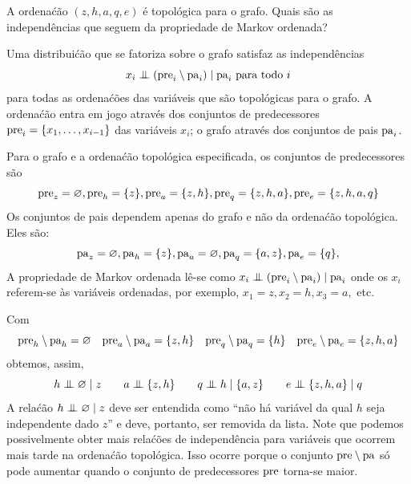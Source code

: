 \begin{center}
\end{center}

\begin{exenumerate}
    \item A ordena\'c\~ao $(z,h,a,q,e)$ \'e topol\'ogica para o grafo. Quais s\~ao as independ\^encias que seguem da propriedade de Markov ordenada?
    
    \begin{solution}
        Uma distribui\'c\~ao que se fatoriza sobre o grafo satisfaz as independ\^encias
        $$ x_i \mathrel{\perp\mspace{-10mu}\perp} \left(\mathrm{pre}_i \setminus \mathrm{pa}_i\right) \mid \mathrm{pa}_i \text{ para todo } i$$
        para todas as ordena\'c\~oes das vari\'aveis que s\~ao topol\'ogicas para o grafo. A ordena\'c\~ao entra em jogo atrav\'es dos conjuntos de predecessores $\mathrm{pre}_i = \{x_1, \ldots, x_{i-1}\}$ das vari\'aveis $x_i$; o grafo atrav\'es dos conjuntos de pais $\mathrm{pa}_i$.
        
        Para o grafo e a ordena\'c\~ao topol\'ogica especificada, os conjuntos de predecessores s\~ao
        $$\mathrm{pre}_z = \varnothing, \mathrm{pre}_h = \{z\}, \mathrm{pre}_a = \{z,h\}, \mathrm{pre}_q = \{z,h,a\}, \mathrm{pre}_e =\{z,h,a,q\}$$
        Os conjuntos de pais dependem apenas do grafo e n\~ao da ordena\'c\~ao topol\'ogica. Eles s\~ao:
        $$\mathrm{pa}_z = \varnothing, \mathrm{pa}_h = \{z\}, \mathrm{pa}_a = \varnothing, \mathrm{pa}_q =\{a,z\}, \mathrm{pa}_e = \{q\}, $$
        A propriedade de Markov ordenada l\^e-se como $x_i \mathrel{\perp\mspace{-10mu}\perp} \left(\mathrm{pre}_i \setminus \mathrm{pa}_i \right)\mid \mathrm{pa}_i$ onde os $x_i$ referem-se \`as vari\'aveis ordenadas, por exemplo, $x_1 = z, x_2 = h, x_3 = a,$ etc.
        
        Com
        $$ \mathrm{pre}_h \setminus \mathrm{pa}_h = \varnothing \quad \mathrm{pre}_a \setminus \mathrm{pa}_a = \{z,h\} \quad \mathrm{pre}_q \setminus \mathrm{pa}_q = \{h\} \quad \mathrm{pre}_e \setminus \mathrm{pa}_e = \{z,h,a\}$$
        obtemos, assim,
        $$ h \independent \varnothing \mid z \quad \quad
        a \independent \{z,h\} \quad \quad q \independent
        h \mid \{a,z\} \quad \quad e \independent \{z,h,a\} \mid q$$ A
        rela\'c\~ao $ h \mathrel{\perp\mspace{-10mu}\perp} \varnothing \mid z$ deve ser entendida como
        ``n\~ao h\'a vari\'avel da qual $h$ seja independente dado $z$'' e
        deve, portanto, ser removida da lista. Note que podemos possivelmente
        obter mais rela\'c\~oes de independ\^encia para vari\'aveis que ocorrem mais tarde na
        ordena\'c\~ao topol\'ogica. Isso ocorre porque o conjunto
        $\mathrm{pre} \setminus \mathrm{pa}$ s\'o pode aumentar quando o conjunto de predecessores
        $\mathrm{pre}$ torna-se maior.
    \end{solution}
    

\end{exenumerate}
